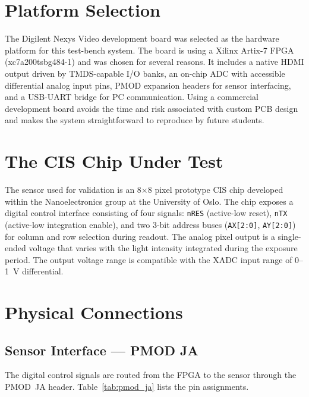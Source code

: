 
\section{Platform Selection}

The Digilent Nexys Video development board was selected as the hardware platform for this test-bench system. The board is using a Xilinx Artix-7 FPGA (xc7a200tsbg484-1) and was chosen for several reasons. It includes a native HDMI output driven by TMDS-capable I/O banks, an on-chip ADC with accessible differential analog input pins, PMOD expansion headers for sensor interfacing, and a USB-UART bridge for PC communication.
Using a commercial development board avoids the time and risk associated with custom PCB design and makes the system straightforward to reproduce by future students.

\section{The CIS Chip Under Test}
The sensor used for validation is an 8$\times$8 pixel prototype CIS chip developed within the Nanoelectronics group at the University of Oslo. The chip exposes a digital control interface consisting of four signals: \texttt{nRES} (active-low reset), \texttt{nTX} (active-low integration enable), and two 3-bit address buses (\texttt{AX[2:0]}, \texttt{AY[2:0]}) for column and row selection during readout. The analog pixel output is a single-ended voltage that varies with the light intensity integrated during the exposure period. The output voltage range is compatible with the XADC input range of 0--1~V differential.


\section{Physical Connections}

\subsection{Sensor Interface --- PMOD JA}

The digital control signals are routed from the FPGA to the sensor through the PMOD~JA header. Table~\ref{tab:pmod_ja} lists the pin assignments.

